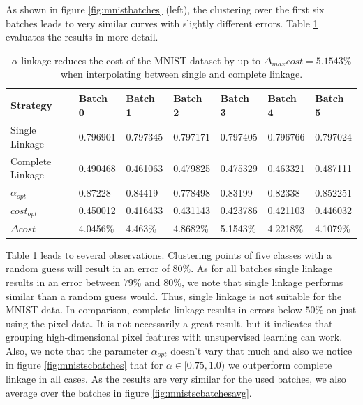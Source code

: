 As shown in figure \ref{fig:mnistbatches} (left), the clustering over the first six batches leads to very similar curves with slightly different errors. Table \ref{table:mnistscbatches} evaluates the results in more detail.

\begin{table}[H]
    \centering
    \begin{tabular}{|l | l l l l l l |}
    \hline
    Strategy & Batch 0 & Batch 1 & Batch 2 & Batch 3 & Batch 4 & Batch 5\\ \hline
    Single Linkage & 0.796901 & 0.797345 & 0.797171 & 0.797405 & 0.796766 & 0.797024\\
    Complete Linkage & 0.490468 & 0.461063 & 0.479825 & 0.475329 & 0.463321 & 0.487111\\
    $\alpha_{opt}$ & 0.87228 & 0.84419 & 0.778498 & 0.83199 & 0.82338 & 0.852251\\
    $cost_{opt}$ & 0.450012 & 0.416433 & 0.431143 & 0.423786 & 0.421103 & 0.446032\\
    $\Delta cost$ & 4.0456\% & 4.463\% & 4.8682\% & 5.1543\% & 4.2218\% & 4.1079\%\\\hline
    \end{tabular}
    \caption{$\alpha$-linkage reduces the cost of the MNIST dataset by up to $\Delta_{max} cost = 5.1543\%$ when interpolating between single and complete linkage.}
    \label{table:mnistscbatches}
\end{table}

Table \ref{table:mnistscbatches} leads to several observations. Clustering points of five classes with a random guess will result in an error of $80\%$. As for all batches single linkage results in an error between $79\%$ and $80\%$, we note that single linkage performs similar than a random guess would. Thus, single linkage is not suitable for the MNIST data. In comparison, complete linkage results in errors below $50\%$ on just using the pixel data. It is not necessarily a great result, but it indicates that grouping high-dimensional pixel features with unsupervised learning can work. Also, we note that the parameter $\alpha_{opt}$ doesn't vary that much and also we notice in figure \ref{fig:mnistscbatches} that for $\alpha \in [0.75,1.0)$ we outperform complete linkage in all cases. As the results are very similar for the used batches, we also average over the batches in figure \ref{fig:mnistscbatchesavg}.

